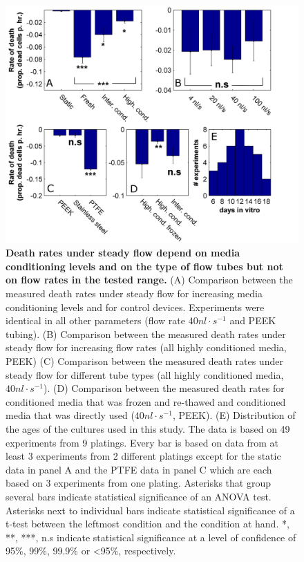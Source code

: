     \begin{figure}[!htb]
            \centering
            \includegraphics[width=15cm]{chapter4/figures/viabilityStats/viabilityStats.jpg}
            \caption[Statistics of death rates for various steady flow conditions]{\textbf{Death rates under steady flow depend on media conditioning levels and on the type of flow tubes but not on flow rates in the tested range.} (A) Comparison between the measured death rates under steady flow for increasing media conditioning levels and for control devices. Experiments were identical in all other parameters (flow rate \(40 nl\cdot s^{-1}\) and PEEK tubing). (B) Comparison between the measured death rates under steady flow for increasing flow rates (all highly conditioned media, PEEK) (C)  Comparison between the measured death rates under steady flow for different tube types (all highly conditioned media, \(40 nl\cdot s^{-1}\)). (D) Comparison between the measured death rates for conditioned media that was frozen and re-thawed and conditioned media that was directly used (\(40 nl\cdot s^{-1}\), PEEK). (E) Distribution of the ages of the cultures used in this study. The data is based on 49 experiments from 9 platings. Every bar is based on data from at least 3 experiments from 2 different platings except for the static data in panel A and the PTFE data in panel C which are each based on 3 experiments from one plating. Asterisks that group several bars indicate statistical significance of an ANOVA test. Asterisks next to individual bars indicate statistical significance of a t-test between the leftmost condition and the condition at hand. *, **, ***, n.s indicate statistical significance at a level of confidence of 95\%, 99\%, 99.9\% or \textless95\%, respectively.}
            \label{fig:devices:viabilityStats}

    \end{figure}


